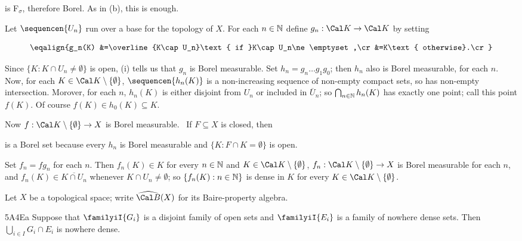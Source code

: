 {

\noindent is F$_{\sigma}$, therefore Borel.   As in (b), this is enough.\
\Qed

\medskip

 Let $\sequencen{U_n}$ run over a base for the topology of
$X$.   For each $n\in\Bbb N$ define $g_n:\Cal K\to\Cal K$ by setting

$$\eqalign{g_n(K)
&=\overline{K\cap U_n}\text{ if }K\cap U_n\ne\emptyset,\cr
&=K\text{ otherwise}.\cr}$$

\noindent Since $\{K:K\cap U_n\ne\emptyset\}$ is open,
(i) tells us that $g_n$ is Borel measurable.   Set $h_n=g_n\ldots g_1g_0$;
then $h_n$ also is Borel measurable, for each $n$.   Now, for each
$K\in\Cal K\setminus\{\emptyset\}$, $\sequencen{h_n(K)}$ is a
non-increasing sequence of non-empty compact sets, so has non-empty
intersection.   Morover, for each $n$, $h_n(K)$ is either disjoint from
$U_n$ or included in $\overline{U}_n$;  so
$\bigcap_{n\in\Bbb N}h_n(K)$ has exactly one point;  call this point
$f(K)$.   Of course $f(K)\in h_0(K)\subseteq K$.

Now $f:\Cal K\setminus\{\emptyset\}\to X$ is Borel measurable.   \Prf\
If $F\subseteq X$ is closed, then


\noindent is a Borel set because every $h_n$ is Borel measurable and
$\{K:F\cap K=\emptyset\}$ is open.\ \Qed

\medskip

 Set $f_n=fg_n$ for each $n$.   Then $f_n(K)\in K$ for
every $n\in\Bbb N$ and $K\in\Cal K\setminus\{\emptyset\}$,
$f_n:\Cal K\setminus\{\emptyset\}\to X$ is Borel measurable for each $n$,
and $f_n(K)\in\overline{K\cap U_n}$ whenever $K\cap U_n\ne\emptyset$;
so $\{f_n(K):n\in\Bbb N\}$ is dense in $K$ for every
$K\in\Cal K\setminus\{\emptyset\}$.
}%

Let $X$ be a topological space;  write $\widehat{\Cal B}(X)$ for its
Baire-property algebra\cmmnt{ (4A3Q)}.

\spheader 5A4Ea Suppose that
$\familyiI{G_i}$ is a disjoint family of open sets and
$\familyiI{E_i}$ is a family of nowhere dense sets.   Then
$\bigcup_{i\in I}G_i\cap E_i$ is nowhere dense.

